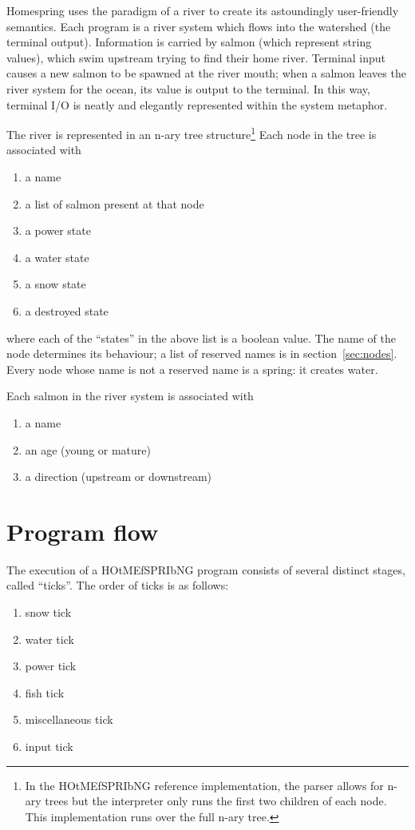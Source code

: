 \documentclass[10pt]{article}
\begin{document}
Homespring uses the paradigm of a river to create its astoundingly user-friendly semantics. Each program is a river system which flows into the watershed (the terminal output). Information is carried by salmon (which represent string values), which swim upstream trying to find their home river.
Terminal input causes a new salmon to be spawned at the river mouth; when a salmon leaves the river system for the ocean,
its value is output to the terminal. In this way, terminal I/O is neatly and elegantly represented within the system
metaphor.

The river is represented in an n-ary tree structure\footnote{In the HOtMEfSPRIbNG reference implementation, the parser
allows for n-ary trees but the interpreter only runs the first two children of each node. This implementation runs over
the full n-ary tree.} Each node in the tree is associated with
\begin{enumerate}
\item a name
\item a list of salmon present at that node
\item a power state
\item a water state
\item a snow state
\item a destroyed state
\end{enumerate}
where each of the ``states'' in the above list is a boolean value. The name of the node determines its behaviour; a list
of reserved names is in section~\ref{sec:nodes}. Every node whose name is not a reserved name is a spring: it creates water.

Each salmon in the river system is associated with
\begin{enumerate}
\item a name
\item an age (young or mature)
\item a direction (upstream or downstream)
\end{enumerate}

\section{Program flow}

The execution of a HOtMEfSPRIbNG program consists of several distinct stages, called ``ticks''. The order of ticks is as
follows:
\begin{enumerate}
\item snow tick
\item water tick
\item power tick
\item fish tick
\item miscellaneous tick
\item input tick
\end{enumerate}
\end{document}
